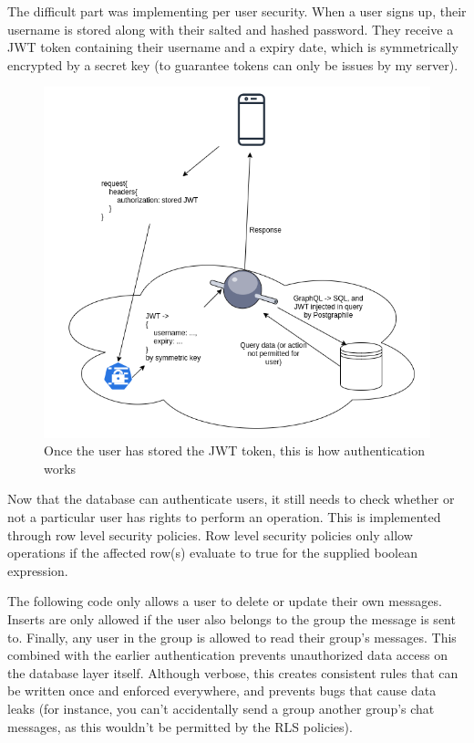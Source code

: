 \documentclass{l4proj}
\begin{document}
The difficult part was implementing per user security. When a user signs up, their username is stored along with their salted and hashed password. They receive a JWT token containing their username and a expiry date, which is symmetrically encrypted by a secret key (to guarantee tokens can only be issues by my server). 

\begin{figure}[H]
    \centering
    \includegraphics[width=1.0\linewidth]{authentication.png}    
    \caption{
  Once the user has stored the JWT token, this is how authentication works
    }
\end{figure}

Now that the database can authenticate users, it still needs to check whether or not a particular user has rights to perform an operation. This is implemented through row level security policies. Row level security policies only allow operations if the affected row(s) evaluate to true for the supplied boolean expression.

The following code only allows a user to delete or update their own messages. Inserts are only allowed if the user also belongs to the group the message is sent to. Finally, any user in the group is allowed to read their group's messages. This combined with the earlier authentication prevents unauthorized data access on the database layer itself. Although verbose, this creates consistent rules that can be written once and enforced everywhere, and prevents bugs that cause data leaks (for instance, you can't accidentally send a group another group's chat messages, as this wouldn't be permitted by the RLS policies).
\end{document}
